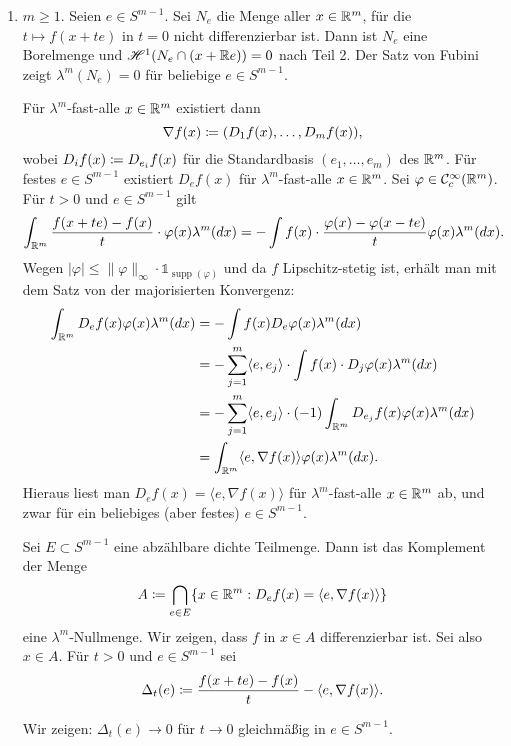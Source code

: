 \documentclass[a4paper,twoside,DIV15,BCOR12mm]{scrbook}
\newcommand{\ind}{\mathds 1}
\newcommand{\HM}{\H}
\DeclareMathOperator{\supp}{supp}
\begin{document}
\begin{beweis}
\begin{enumerate}[{Teil} 1:]
\item $m\ge 1$. Seien $e\in S^{m-1}$. Sei $N_e$ die Menge aller $x\in\mathbb{R}^m$, für die $t \mapsto f(x+te)$ in $t=0$ nicht differenzierbar ist. Dann ist $N_e$ eine Borelmenge und $\HM^1(N_e \cap (x+\MdR e)) = 0$ nach Teil 2. Der Satz von Fubini zeigt $\lambda^m(N_e) = 0$ für beliebige $e\in S^{m-1}$.

Für $\lambda^m$-fast-alle $x\in\mathbb{R}^m$ existiert dann 
\[
\nabla f(x) \da (D_1 f(x), \ldots, D_mf(x)),
\]
wobei $D_if(x) \da D_{e_i}f(x)$ für die Standardbasis $(e_1,\ldots,e_m)$ des $\mathbb{R}^m$. Für festes $e\in S^{m-1}$ existiert $D_ef(x)$ für $\lambda^m$-fast-alle $x\in\mathbb{R}^m$. Sei $\varphi \in\mathcal C^\infty_c(\mathbb{R}^m)$. Für $t>0$ und $e\in S^{m-1}$ gilt
\[
\int_{\mathbb{R}^m} \frac{f(x+t e) - f(x)}{t} \cdot \varphi(x) \lambda^m(dx)
= 
-\int f(x) \cdot \frac{\varphi(x) - \varphi(x-t e)}{t}\varphi(x) \lambda^m(dx).
\]
Wegen $|\varphi| \le \|\varphi\|_\infty \cdot \ind_{\supp(\varphi)}$ und da $f$ Lipschitz-stetig ist, erhält man   mit dem Satz von der majorisierten Konvergenz:
\begin{align*}
\int_{\mathbb{R}^m} D_ef(x) \varphi(x) \lambda^m(dx)
&= -\int f(x) D_e\varphi(x) \lambda^m(dx) \\
&= - \sum_{j=1}^m \langle e, e_j\rangle \cdot \int f(x) \cdot D_j \varphi(x)\lambda^m(dx) \\
&= - \sum_{j=1}^m \langle e, e_j\rangle \cdot (-1) \int_{\mathbb{R}^m} D_{e_j} f(x) \varphi(x) \lambda^m(dx) \\
&= \int_{\mathbb{R}^m} \langle e, \nabla f(x) \rangle \varphi(x) \lambda^m(dx).
\end{align*}
Hieraus liest man $D_ef(x) = \langle e,\nabla f(x) \rangle$ für $\lambda^m$-fast-alle $x\in\mathbb{R}^m$ ab, und zwar   
für ein beliebiges (aber festes) $e\in S^{m-1}$.

Sei $E\subset S^{m-1}$ eine abzählbare dichte Teilmenge. Dann ist das Komplement der Menge 
\[
A \da \bigcap_{e\in E}\{x\in\MdR^m : D_ef(x) = \langle e, \nabla f(x) \rangle\}
\]
eine $\lambda^m$-Nullmenge. Wir zeigen, dass $f$ in $x\in A$ differenzierbar ist. Sei also $x\in A$. Für $t>0$ und $e\in S^{m-1}$ sei
\[
\Delta_t(e) \da \frac{f(x+t e)- f(x)}{t} - \langle e,\nabla f(x) \rangle.
\]

Wir zeigen: $\Delta_t(e) \to 0$ für $t\to 0$ gleichmäßig in $e\in S^{m-1}$.


\end{enumerate}
\end{beweis}
\end{document}
